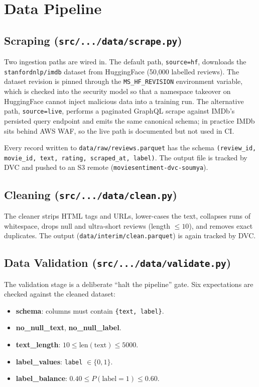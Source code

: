 \documentclass[11pt,a4paper]{article}
\begin{document}
\section{Data Pipeline}

\subsection{Scraping (\texttt{src/.../data/scrape.py})}

Two ingestion paths are wired in. The default path, \texttt{source=hf}, downloads the
\texttt{stanfordnlp/imdb} dataset from HuggingFace (50{,}000 labelled reviews).
The dataset revision is pinned through the \texttt{MS\_HF\_REVISION} environment
variable, which is checked into the security model so that a namespace takeover on
HuggingFace cannot inject malicious data into a training run. The alternative path,
\texttt{source=live}, performs a paginated GraphQL scrape against IMDb's persisted
query endpoint and emits the same canonical schema; in practice IMDb sits behind AWS
WAF, so the live path is documented but not used in CI.

Every record written to \texttt{data/raw/reviews.parquet} has the schema
\texttt{(review\_id, movie\_id, text, rating, scraped\_at, label)}. The output file is
tracked by DVC and pushed to an S3 remote (\texttt{moviesentiment-dvc-soumya}).

\subsection{Cleaning (\texttt{src/.../data/clean.py})}

The cleaner strips HTML tags and URLs, lower-cases the text, collapses runs of
whitespace, drops null and ultra-short reviews (length $\leq 10$), and removes exact
duplicates. The output (\texttt{data/interim/clean.parquet}) is again tracked by DVC.

\subsection{Data Validation (\texttt{src/.../data/validate.py})}

The validation stage is a deliberate ``halt the pipeline'' gate. Six expectations are
checked against the cleaned dataset:

\begin{itemize}[leftmargin=*]
\item \textbf{schema}: columns must contain \texttt{\{text, label\}}.
\item \textbf{no\_null\_text}, \textbf{no\_null\_label}.
\item \textbf{text\_length}: $10 \leq \text{len}(\text{text}) \leq 5000$.
\item \textbf{label\_values}: \texttt{label} $\in \{0, 1\}$.
\item \textbf{label\_balance}: $0.40 \leq P(\text{label}=1) \leq 0.60$.
\end{itemize}
\end{document}

